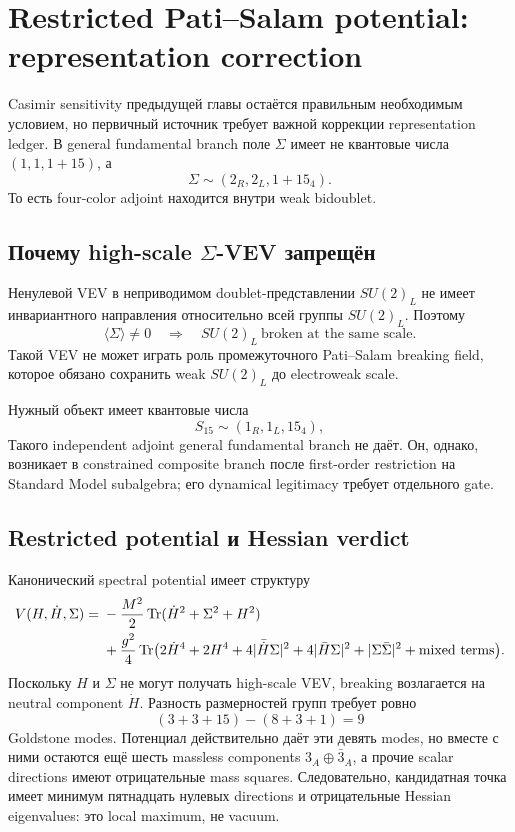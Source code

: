 \chapter{Restricted Pati--Salam potential: representation correction}

Casimir sensitivity предыдущей главы остаётся правильным необходимым
условием, но первичный источник требует важной коррекции representation
ledger. В general fundamental branch поле \(\Sigma\) имеет
не квантовые числа \((1,1,1+15)\), а
\begin{equation}
 \boxed{\Sigma\sim(2_R,2_L,1+15_4).}
\end{equation}
То есть four-color adjoint находится внутри weak bidoublet.

\section{\texorpdfstring{Почему high-scale \(\Sigma\)-VEV запрещён}{Почему high-scale Sigma-VEV запрещён}}

Ненулевой VEV в неприводимом doublet-представлении \(SU(2)_L\) не имеет
инвариантного направления относительно всей группы \(SU(2)_L\). Поэтому
\begin{equation}
 \langle\Sigma\rangle\neq0
 \quad\Longrightarrow\quad
 SU(2)_L\ \text{broken at the same scale}.
\end{equation}
Такой VEV не может играть роль промежуточного Pati--Salam breaking field,
которое обязано сохранить weak \(SU(2)_L\) до electroweak scale.

Нужный объект имеет квантовые числа
\begin{equation}
 S_{15}\sim(1_R,1_L,15_4),
\end{equation}
Такого independent adjoint general fundamental branch не даёт. Он, однако,
возникает в constrained composite branch после first-order restriction на
Standard Model subalgebra; его dynamical legitimacy требует отдельного gate.

\section{Restricted potential и Hessian verdict}

Канонический spectral potential имеет структуру
\begin{align}
 V(H,\dot H,\Sigma)={}&
 -\frac{M^2}{2}\operatorname{Tr}(\dot H^2+\Sigma^2+H^2)\\
 &+\frac{g^2}{4}\operatorname{Tr}\bigl(
 2\dot H^4+2H^4+4|\bar{\dot H}\Sigma|^2
 +4|\bar H\Sigma|^2+|\Sigma\bar\Sigma|^2
 +\text{mixed terms}\bigr).
\end{align}
Поскольку \(H\) и \(\Sigma\) не могут получать high-scale VEV, breaking
возлагается на neutral component \(\dot H\). Разность размерностей групп
требует ровно
\begin{equation}
 (3+3+15)-(8+3+1)=9
\end{equation}
Goldstone modes. Потенциал действительно даёт эти девять modes, но вместе с
ними остаются ещё шесть massless components \(3_A\oplus\bar3_A\), а прочие
scalar directions имеют отрицательные mass squares. Следовательно,
кандидатная точка имеет минимум пятнадцать нулевых directions и отрицательные
Hessian eigenvalues: это local maximum, не vacuum.


